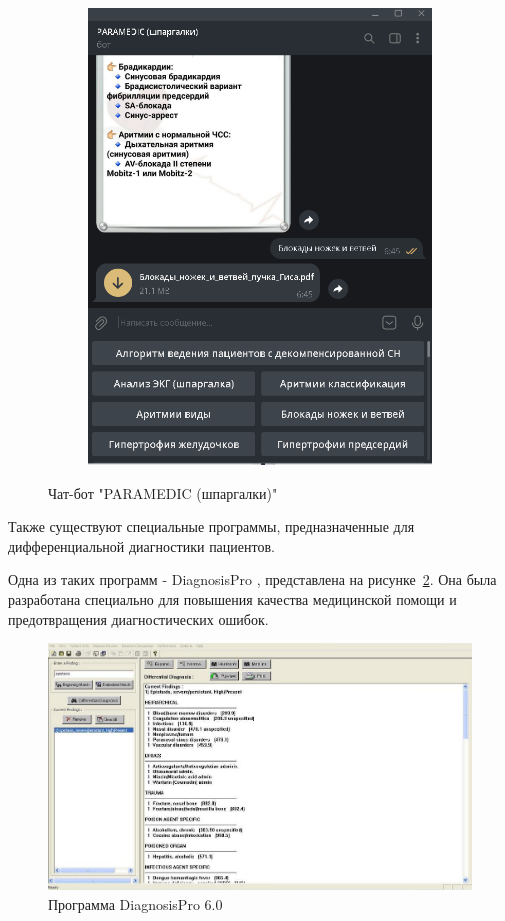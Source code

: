 \begin{figure}
\begin{subfigure}[t]{0.5\linewidth}
    \includegraphics[scale=0.4]{src/exbot2.png}
    \caption{}
  \end{subfigure}
  \caption{Чат-бот "PARAMEDIC (шпаргалки)"}
  \label{fig:bot}
\end{figure}

Также существуют специальные программы, предназначенные для дифференциальной диагностики пациентов.

Одна из таких программ - DiagnosisPro \cite{DiagnosisPro}, представлена на рисунке~\ref{fig:diagpro}. Она была разработана специально для повышения качества медицинской помощи и предотвращения диагностических ошибок.

\begin{figure}
  \includegraphics[scale=0.5]{src/diag_pro6.jpg}
  \caption{Программа DiagnosisPro 6.0}
  \label{fig:diagpro}
\end{figure}

